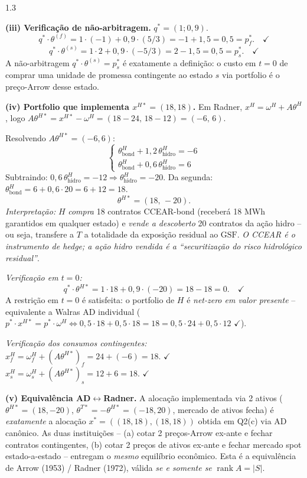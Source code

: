 \documentclass[11pt,addpoints]{exam}
\newcommand{\rank}{\operatorname{rank}}
\newcommand{\GSF}{\text{GSF}}
\begin{document}
\begin{spacing}{1.3}
\begin{questions}
\begin{parts}
\begin{solution}
\textbf{(iii) Verificação de não-arbitragem.} $q^* = (1; 0{,}9)$.
\[
    q^* \cdot \theta^{(f)} = 1\cdot (-1) + 0{,}9\cdot (5/3) = -1 + 1{,}5 = 0{,}5 = p^*_f. \quad \checkmark
\]
\[
    q^* \cdot \theta^{(s)} = 1\cdot 2 + 0{,}9\cdot (-5/3) = 2 - 1{,}5 = 0{,}5 = p^*_s. \quad \checkmark
\]
A não-arbitragem $q^* \cdot \theta^{(s)} = p^*_s$ é exatamente a definição: o custo em $t = 0$ de comprar uma unidade de promessa contingente ao estado $s$ via portfolio é o preço-Arrow desse estado.

\textbf{(iv) Portfolio que implementa $x^{H*} = (18, 18)$.} Em Radner, $x^{H} = \omega^H + A\theta^H$, logo $A\theta^{H*} = x^{H*} - \omega^H = (18 - 24,\, 18 - 12) = (-6,\, 6)$.

Resolvendo $A\theta^{H*} = (-6, 6)$:
\[
    \begin{cases}
    \theta^H_{\text{bond}} + 1{,}2\, \theta^H_{\text{hidro}} = -6 \\
    \theta^H_{\text{bond}} + 0{,}6\, \theta^H_{\text{hidro}} = 6
    \end{cases}
\]
Subtraindo: $0{,}6\, \theta^H_{\text{hidro}} = -12 \Rightarrow \theta^H_{\text{hidro}} = -20$. Da segunda: $\theta^H_{\text{bond}} = 6 + 0{,}6\cdot 20 = 6 + 12 = 18$.
\[
    \boxed{\theta^{H*} = (18,\, -20).}
\]
\emph{Interpretação:} $H$ \emph{compra} 18 contratos CCEAR-bond (receberá 18 MWh garantidos em qualquer estado) e \emph{vende a descoberto} 20 contratos da ação hidro -- ou seja, transfere a $T$ a totalidade da exposição residual ao $\GSF$. \emph{O CCEAR é o instrumento de hedge; a ação hidro vendida é a ``securitização do risco hidrológico residual''}.

\emph{Verificação em $t = 0$:}
\[
    q^* \cdot \theta^{H*} = 1\cdot 18 + 0{,}9\cdot (-20) = 18 - 18 = 0. \quad \checkmark
\]
A restrição em $t = 0$ é satisfeita: o portfolio de $H$ é \emph{net-zero em valor presente} -- equivalente a Walras AD individual ($p^* \cdot x^{H*} = p^* \cdot \omega^H \Leftrightarrow 0{,}5\cdot 18 + 0{,}5\cdot 18 = 18 = 0{,}5\cdot 24 + 0{,}5\cdot 12$ $\checkmark$).

\emph{Verificação dos consumos contingentes:}
$x^H_f = \omega^H_f + (A\theta^{H*})_f = 24 + (-6) = 18.$ $\checkmark$
$x^H_s = \omega^H_s + (A\theta^{H*})_s = 12 + 6 = 18.$ $\checkmark$

\textbf{(v) Equivalência AD$\leftrightarrow$Radner.} A alocação implementada via 2 ativos ($\theta^{H*} = (18, -20)$, $\theta^{T*} = -\theta^{H*} = (-18, 20)$, mercado de ativos fecha) é \emph{exatamente} a alocação $x^* = ((18, 18), (18, 18))$ obtida em Q2(c) via AD canônico. As duas instituições -- (a) cotar 2 preços-Arrow ex-ante e fechar contratos contingentes, (b) cotar 2 preços de ativos ex-ante e fechar mercado spot estado-a-estado -- entregam o \emph{mesmo} equilíbrio econômico. Esta é a equivalência de Arrow (1953) / Radner (1972), válida \emph{se e somente se} $\rank A = |S|$.


\end{solution}
\end{parts}
\end{questions}
\end{spacing}
\end{document}
